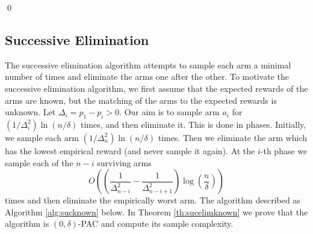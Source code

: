 \qed


\subsection{Successive Elimination}
\label{sub:successive}

The successive elimination algorithm attempts to sample each arm a minimal
number of times and eliminate the arms one after the other.
To motivate the successive elimination algorithm, we first assume that the
expected rewards of the arms are known, but the matching of the
arms to the expected rewards is unknown. Let $\Delta_i = p_{1} -
p_{i} >0$.
Our aim is to sample arm $a_i$ for
$(1/\Delta_i^2) \ln(n/\delta)$ times, and then
eliminate it. This is done in phases. Initially, we sample each
arm $(1/\Delta_n^2)\ln(n/\delta)$ times. Then we
eliminate the arm which has the lowest empirical reward (and never
sample it again). At the $i$-th phase we sample each of the $n-i$
surviving arms
$$O\left(\left(\frac{1}{\Delta_{n-i}^2} -
\frac{1}{\Delta_{n-i+1}^2}\right)\log{(\frac{n}{\delta})}\right)$$
times and
then eliminate the empirically worst arm. The algorithm described as
Algorithm \ref{alg:sucknown} below. In Theorem \ref{th:sucelimknown} we prove
that the algorithm is $(0,\delta)$-PAC and compute its sample complexity.

